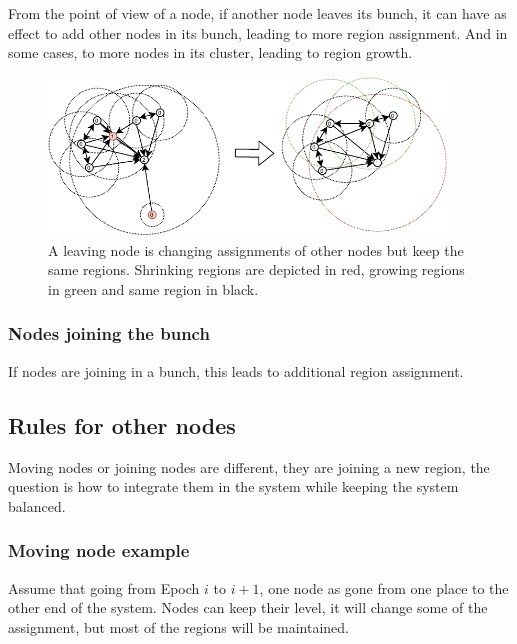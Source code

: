 \documentclass[a4paper,11pt,oneside]{report}
\begin{document}
From the point of view of a node, if another node leaves its bunch, it can have
as effect to add other nodes in its bunch, leading to more region assignment.
And in some cases, to more nodes in its cluster, leading to region growth. 

\begin{figure}[!h] 
\centering
\includegraphics[width=300pt]{figures/LocarnoTreaties-Leaving-cluster}
\caption{A leaving node is changing assignments of other
    nodes but keep the same regions. Shrinking regions are depicted in red,
    growing regions in green and same region in black. }
\label{fig:LocarnoTreaties-Leaving-cluster}
\end{figure}

\subsubsection{Nodes joining the bunch} 
If nodes are joining in a bunch, this leads to additional region assignment. 

\subsection{Rules for other nodes}
Moving nodes or joining nodes are different, they are joining a new region, the
question is how to integrate them in the system while keeping the system
balanced. 

\subsubsection{Moving node example}
Assume that going from Epoch $i$ to $i+1$, one node as gone from one place to
the other end of the system.  Nodes can keep their level, it will change some
of the assignment, but most of the regions will be maintained. 
\end{document}
